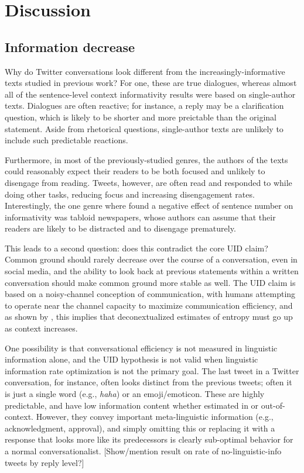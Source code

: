 \documentclass[11pt,letterpaper]{article}
\begin{document}
\section{Discussion}

\subsection{Information decrease}
Why do Twitter conversations look different from the increasingly-informative texts studied in previous work? For one, these are true dialogues, whereas almost all of the sentence-level context informativity results were based on single-author texts.  Dialogues are often reactive; for instance, a reply may be a clarification question, which is likely to be shorter and more preictable than the original statement. Aside from rhetorical questions, single-author texts are unlikely to include such predictable reactions.

Furthermore, in most of the previously-studied genres, the authors of the texts could reasonably expect their readers to be both focused and unlikely to disengage from reading. Tweets, however, are often read and responded to while doing other tasks, reducing focus and increasing disengagement rates.  Interestingly, the one genre where  found a negative effect of sentence number on informativity was tabloid newspapers, whose authors can assume that their readers are likely to be distracted and to disengage prematurely.

This leads to a second question: does this contradict the core UID claim?  Common ground should rarely decrease over the course of a conversation, even in social media, and the ability to look back at previous statements within a written conversation should make common ground more stable as well.  The UID claim is based on a noisy-channel conception of communication, with humans attempting to operate near the channel capacity to maximize communication efficiency, and as shown by , this implies that deconextualized estimates of entropy must go up as context increases.

One possibility is that conversational efficiency is not measured in linguistic information alone, and the UID hypothesis is not valid when linguistic information rate optimization is not the primary goal.  The last tweet in a Twitter conversation, for instance, often looks distinct from the previous tweets; often it is just a single word (e.g., {\it haha}) or an emoji/emoticon.  These are highly predictable, and have low information content whether estimated in or out-of-context.  However, they convey important meta-linguistic information (e.g., acknowledgment, approval), and simply omitting this or replacing it with a response that looks more like its predecessors is clearly sub-optimal behavior for a normal conversationalist.  [Show/mention result on rate of no-linguistic-info tweets by reply level?]
\end{document}
